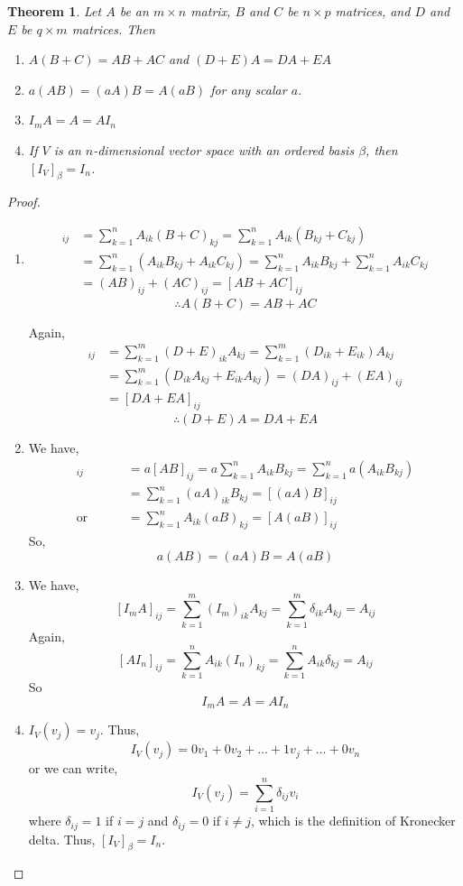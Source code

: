 \documentclass[12pt, a4paper]{article}
\newtheorem{theorem}{Theorem}[section]
\theoremstyle{definition}
\theoremstyle{remark}
\begin{document}
\begin{theorem}
    Let $A$ be an $m \times n$ matrix, $B$ and $C$ be $n \times p$ matrices, and $D$ and $E$ be $q \times m$ matrices. Then
\begin{enumerate}
    \item $A(B+C) = AB + AC$ and $(D+E)A = DA + EA$
    \item $a(AB) = (aA)B = A(aB)$ for any scalar $a$.
    \item $I_m A = A = A I_n$
    \item If $V$ is an $n$-dimensional vector space with an ordered basis $\beta$, then $[I_V]_\beta = I_n$.
\end{enumerate}
\end{theorem}

\begin{proof}
    \begin{enumerate}
        \item \begin{align*}
           [A(B+C)]_{ij} &= \sum_{k=1}^{n} A_{ik}(B+C)_{kj} = \sum_{k=1}^{n} A_{ik}(B_{kj} + C_{kj}) \\
&= \sum_{k=1}^{n} (A_{ik}B_{kj} + A_{ik}C_{kj}) = \sum_{k=1}^{n} A_{ik}B_{kj} + \sum_{k=1}^{n} A_{ik}C_{kj} \\
&= (AB)_{ij} + (AC)_{ij} = [AB + AC]_{ij}
\end{align*}
\[ \therefore A(B+C) = AB + AC \]

\noindent Again,
\begin{align*}
[(D+E)A]_{ij} &= \sum_{k=1}^{m} (D+E)_{ik} A_{kj} = \sum_{k=1}^{m} (D_{ik} + E_{ik}) A_{kj} \\
&= \sum_{k=1}^{m} (D_{ik}A_{kj} + E_{ik}A_{kj}) = (DA)_{ij} + (EA)_{ij} \\
&= [DA + EA]_{ij}
\end{align*}
\[ \therefore (D+E)A = DA + EA \]

\item We have,
\begin{align*}
[a(AB)]_{ij} &= a[AB]_{ij} = a \sum_{k=1}^{n} A_{ik}B_{kj} = \sum_{k=1}^{n} a(A_{ik}B_{kj}) \\
&= \sum_{k=1}^{n} (aA)_{ik} B_{kj} = [(aA)B]_{ij} \\
\text{or } \qquad &= \sum_{k=1}^{n} A_{ik} (aB)_{kj} = [A(aB)]_{ij}
\end{align*}
So,
\[ a(AB) = (aA)B = A(aB) \]

\item We have,
\[ [I_m A]_{ij} = \sum_{k=1}^{m} (I_m)_{ik} A_{kj} = \sum_{k=1}^{m} \delta_{ik} A_{kj} = A_{ij} \]
Again,
\[ [AI_n]_{ij} = \sum_{k=1}^{n} A_{ik} (I_n)_{kj} = \sum_{k=1}^{n} A_{ik} \delta_{kj} = A_{ij} \]
So
\[ I_m A = A = AI_n \]

\item $I_V(v_j) = v_j$. Thus,
\[ I_V(v_j) = 0v_1 + 0v_2 + \dots + 1v_j + \dots + 0v_n \]
\noindent or we can write,
\[ I_V(v_j) = \sum_{i=1}^{n} \delta_{ij} v_i \]
where $\delta_{ij} = 1$ if $i=j$ and $\delta_{ij} = 0$ if $i \neq j$, which is the definition of Kronecker delta. Thus, $[I_V]_\beta = I_n$.
    \end{enumerate}
\end{proof}
\end{document}
